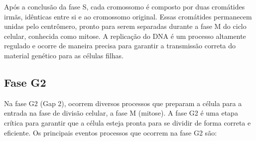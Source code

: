 \documentclass[11pt,a4paper]{article}
\begin{document}
	Após a conclusão da fase S, cada cromossomo é composto por duas cromátides irmãs, idênticas entre si e ao cromossomo original. Essas cromátides permanecem unidas pelo centrômero, pronto para serem separadas durante a fase M do ciclo celular, conhecida como mitose. A replicação do DNA é um processo altamente regulado e ocorre de maneira precisa para garantir a transmissão correta do material genético para as células filhas.

	\subsection{Fase G2}

	Na fase G2 (Gap 2), ocorrem diversos processos que preparam a célula para a entrada na fase de divisão celular, a fase M (mitose). A fase G2 é uma etapa crítica para garantir que a célula esteja pronta para se dividir de forma correta e eficiente. Os principais eventos processos que ocorrem na fase G2 são:
\end{document}
